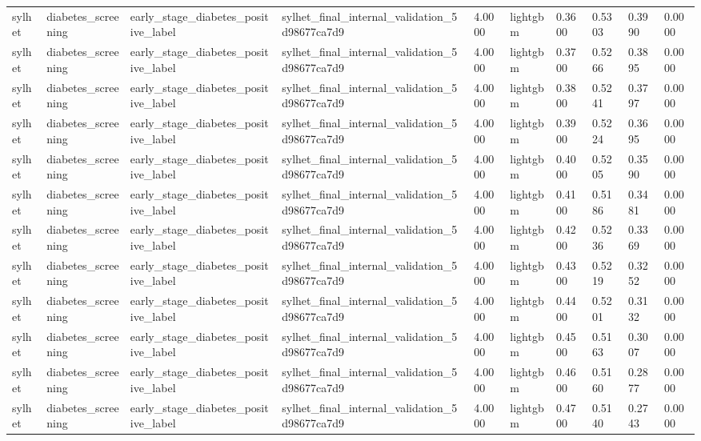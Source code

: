 \begin{tabular}{llllllllll}
sylhet & diabetes\_screening & early\_stage\_diabetes\_positive\_label & sylhet\_final\_internal\_validation\_5d98677ca7d9 & 4.0000 & lightgbm & 0.3600 & 0.5303 & 0.3990 & 0.0000 \\
sylhet & diabetes\_screening & early\_stage\_diabetes\_positive\_label & sylhet\_final\_internal\_validation\_5d98677ca7d9 & 4.0000 & lightgbm & 0.3700 & 0.5266 & 0.3895 & 0.0000 \\
sylhet & diabetes\_screening & early\_stage\_diabetes\_positive\_label & sylhet\_final\_internal\_validation\_5d98677ca7d9 & 4.0000 & lightgbm & 0.3800 & 0.5241 & 0.3797 & 0.0000 \\
sylhet & diabetes\_screening & early\_stage\_diabetes\_positive\_label & sylhet\_final\_internal\_validation\_5d98677ca7d9 & 4.0000 & lightgbm & 0.3900 & 0.5224 & 0.3695 & 0.0000 \\
sylhet & diabetes\_screening & early\_stage\_diabetes\_positive\_label & sylhet\_final\_internal\_validation\_5d98677ca7d9 & 4.0000 & lightgbm & 0.4000 & 0.5205 & 0.3590 & 0.0000 \\
sylhet & diabetes\_screening & early\_stage\_diabetes\_positive\_label & sylhet\_final\_internal\_validation\_5d98677ca7d9 & 4.0000 & lightgbm & 0.4100 & 0.5186 & 0.3481 & 0.0000 \\
sylhet & diabetes\_screening & early\_stage\_diabetes\_positive\_label & sylhet\_final\_internal\_validation\_5d98677ca7d9 & 4.0000 & lightgbm & 0.4200 & 0.5236 & 0.3369 & 0.0000 \\
sylhet & diabetes\_screening & early\_stage\_diabetes\_positive\_label & sylhet\_final\_internal\_validation\_5d98677ca7d9 & 4.0000 & lightgbm & 0.4300 & 0.5219 & 0.3252 & 0.0000 \\
sylhet & diabetes\_screening & early\_stage\_diabetes\_positive\_label & sylhet\_final\_internal\_validation\_5d98677ca7d9 & 4.0000 & lightgbm & 0.4400 & 0.5201 & 0.3132 & 0.0000 \\
sylhet & diabetes\_screening & early\_stage\_diabetes\_positive\_label & sylhet\_final\_internal\_validation\_5d98677ca7d9 & 4.0000 & lightgbm & 0.4500 & 0.5163 & 0.3007 & 0.0000 \\
sylhet & diabetes\_screening & early\_stage\_diabetes\_positive\_label & sylhet\_final\_internal\_validation\_5d98677ca7d9 & 4.0000 & lightgbm & 0.4600 & 0.5160 & 0.2877 & 0.0000 \\
sylhet & diabetes\_screening & early\_stage\_diabetes\_positive\_label & sylhet\_final\_internal\_validation\_5d98677ca7d9 & 4.0000 & lightgbm & 0.4700 & 0.5140 & 0.2743 & 0.0000 \\

\end{tabular}

